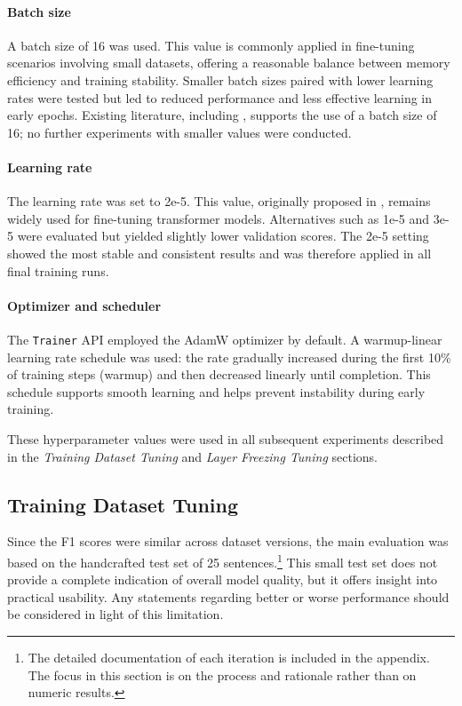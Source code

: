     \paragraph{Batch size} A batch size of 16 was used. This value is commonly applied in fine-tuning scenarios involving small datasets, offering a reasonable balance between memory efficiency and training stability. Smaller batch sizes paired with lower learning rates were tested but led to reduced performance and less effective learning in early epochs. Existing literature, including \textcite{mosbachStabilityFinetuningBERT2021}, supports the use of a batch size of 16; no further experiments with smaller values were conducted.

    \paragraph{Learning rate} The learning rate was set to 2e-5. This value, originally proposed in \textcite{devlinBERTPretrainingDeep2019}, remains widely used for fine-tuning transformer models. Alternatives such as 1e-5 and 3e-5 were evaluated but yielded slightly lower validation scores. The 2e-5 setting showed the most stable and consistent results and was therefore applied in all final training runs.

    \paragraph{Optimizer and scheduler} The \texttt{Trainer} API employed the AdamW optimizer by default. A warmup-linear learning rate schedule was used: the rate gradually increased during the first 10\% of training steps (warmup) and then decreased linearly until completion. This schedule supports smooth learning and helps prevent instability during early training.

    These hyperparameter values were used in all subsequent experiments described in the \textit{Training Dataset Tuning} and \textit{Layer Freezing Tuning} sections.

\subsection{Training Dataset Tuning} \label{subsection:training_dataset_tuning}
    Since the F1 scores were similar across dataset versions, the main evaluation was based on the handcrafted test set of 25 sentences.\footnote{The detailed documentation of each iteration is included in the appendix. The focus in this section is on the process and rationale rather than on numeric results.} This small test set does not provide a complete indication of overall model quality, but it offers insight into practical usability. Any statements regarding better or worse performance should be considered in light of this limitation.

